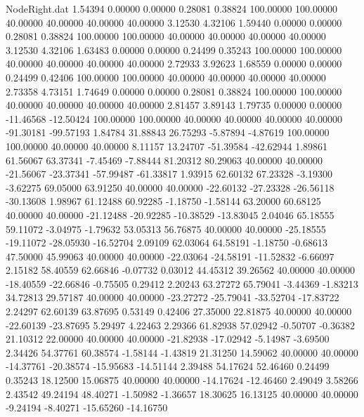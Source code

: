 \begin{filecontents}{NodeRight.dat}
   1.54394    0.00000    0.00000     0.28081    0.38824  100.00000  100.00000   40.00000   40.00000   40.00000   40.00000    3.12530    4.32106
   1.59440    0.00000    0.00000     0.28081    0.38824  100.00000  100.00000   40.00000   40.00000   40.00000   40.00000    3.12530    4.32106
   1.63483    0.00000    0.00000     0.24499    0.35243  100.00000  100.00000   40.00000   40.00000   40.00000   40.00000    2.72933    3.92623
   1.68559    0.00000    0.00000     0.24499    0.42406  100.00000  100.00000   40.00000   40.00000   40.00000   40.00000    2.73358    4.73151
   1.74649    0.00000    0.00000     0.28081    0.38824  100.00000  100.00000   40.00000   40.00000   40.00000   40.00000    2.81457    3.89143
   1.79735    0.00000    0.00000   -11.46568  -12.50424  100.00000  100.00000   40.00000   40.00000   40.00000   40.00000  -91.30181  -99.57193
   1.84784   31.88843   26.75293    -5.87894   -4.87619  100.00000  100.00000   40.00000   40.00000    8.11157   13.24707  -51.39584  -42.62944
   1.89861   61.56067   63.37341    -7.45469   -7.88444   81.20312   80.29063   40.00000   40.00000  -21.56067  -23.37341  -57.99487  -61.33817
   1.93915   62.60132   67.23328    -3.19300   -3.62275   69.05000   63.91250   40.00000   40.00000  -22.60132  -27.23328  -26.56118  -30.13608
   1.98967   61.12488   60.92285    -1.18750   -1.58144   63.20000   60.68125   40.00000   40.00000  -21.12488  -20.92285  -10.38529  -13.83045
   2.04046   65.18555   59.11072    -3.04975   -1.79632   53.05313   56.76875   40.00000   40.00000  -25.18555  -19.11072  -28.05930  -16.52704
   2.09109   62.03064   64.58191    -1.18750   -0.68613   47.50000   45.99063   40.00000   40.00000  -22.03064  -24.58191  -11.52832   -6.66097
   2.15182   58.40559   62.66846    -0.07732    0.03012   44.45312   39.26562   40.00000   40.00000  -18.40559  -22.66846   -0.75505    0.29412
   2.20243   63.27272   65.79041    -3.44369   -1.83213   34.72813   29.57187   40.00000   40.00000  -23.27272  -25.79041  -33.52704  -17.83722
   2.24297   62.60139   63.87695     0.53149    0.42406   27.35000   22.81875   40.00000   40.00000  -22.60139  -23.87695    5.29497    4.22463
   2.29366   61.82938   57.02942    -0.50707   -0.36382   21.10312   22.00000   40.00000   40.00000  -21.82938  -17.02942   -5.14987   -3.69500
   2.34426   54.37761   60.38574    -1.58144   -1.43819   21.31250   14.59062   40.00000   40.00000  -14.37761  -20.38574  -15.95683  -14.51144
   2.39488   54.17624   52.46460     0.24499    0.35243   18.12500   15.06875   40.00000   40.00000  -14.17624  -12.46460    2.49049    3.58266
   2.43542   49.24194   48.40271    -1.50982   -1.36657   18.30625   16.13125   40.00000   40.00000   -9.24194   -8.40271  -15.65260  -14.16750

\end{filecontents}
